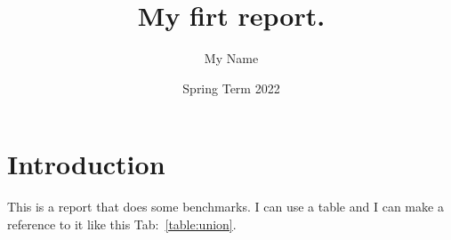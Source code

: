\documentclass[a4paper,11pt]{article}
\begin{document}
\title{
    \textbf{My firt report.}
}
\author{My Name}
\date{Spring Term 2022}

\maketitle

\section*{Introduction}

This is a report that does some benchmarks. I can use a table and I
can make a reference to it like this Tab:~\ref{table:union}.


\end{document}
